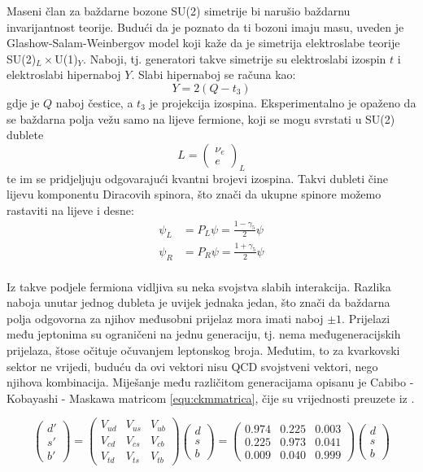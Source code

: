 \documentclass[a4paper,12pt]{report}
\begin{document}
Maseni član za baždarne bozone SU(2) simetrije bi narušio baždarnu invarijantnost teorije. Budući da je poznato da ti bozoni imaju masu, uveden je Glashow-Salam-Weinbergov model koji kaže da je simetrija elektroslabe teorije SU(2)$_L\times$U(1)$_Y$. Naboji, tj. generatori takve simetrije su elektroslabi izospin $t$ i elektroslabi hipernaboj $Y$. 
Slabi hipernaboj se računa kao:
\begin{equation}
 Y=2(Q-t_3)
\label{equ:hipernaboj}
\end{equation}
gdje je $Q$ naboj čestice, a $t_3$ je projekcija izospina. 
Eksperimentalno je opaženo da se baždarna polja vežu samo na lijeve fermione, koji se mogu svrstati u SU(2) dublete $$L=\left(\begin{array}{c}\nu_{e}\\ e\end{array} \right)_{L}$$ te im se pridjeljuju odgovarajući kvantni brojevi izospina. Takvi dubleti čine lijevu komponentu Diracovih spinora, što znači da ukupne spinore možemo rastaviti na lijeve i desne:
\begin{align}
 \psi_L&=P_L \psi= \frac{1- \gamma_5}{2}\psi \\
 \psi_R&=P_R \psi= \frac{1+ \gamma_5}{2}\psi \\
\end{align}

Iz takve podjele fermiona vidljiva su neka svojstva slabih interakcija. Razlika naboja unutar jednog dubleta je uvijek jednaka jedan, što znači da baždarna polja odgovorna za njihov međusobni prijelaz mora imati naboj $\pm 1$. Prijelazi među jeptonima su ograničeni na jednu generaciju, tj. nema međugeneracijskih prijelaza, štose očituje očuvanjem leptonskog broja. Međutim, to za kvarkovski sektor ne vrijedi, buduću da ovi vektori nisu QCD svojstveni vektori, nego njihova kombinacija. Miješanje među različitom generacijama opisanu je Cabibo - Kobayashi - Maskawa matricom \ref{equ:ckmmatrica}, čije su vrijednosti preuzete iz \cite{ckm}.

  
\begin{equation} \begin{pmatrix} d' \\ s' \\ b' \end{pmatrix} = \begin{pmatrix}
V_{ud} & V_{us} & V_{ub} \\
V_{cd} & V_{cs} & V_{cb} \\
V_{td} & V_{ts} & V_{tb} \end{pmatrix} \begin{pmatrix} d \\ s \\ b \end{pmatrix}
= \begin{pmatrix}
0.974 & 0.225 & 0.003 \\
0.225 & 0.973 & 0.041 \\
0.009 & 0.040 & 0.999 \end{pmatrix} \begin{pmatrix} d \\ s \\ b \end{pmatrix} \label{equ:ckmmatrica} \end{equation}
\end{document}
